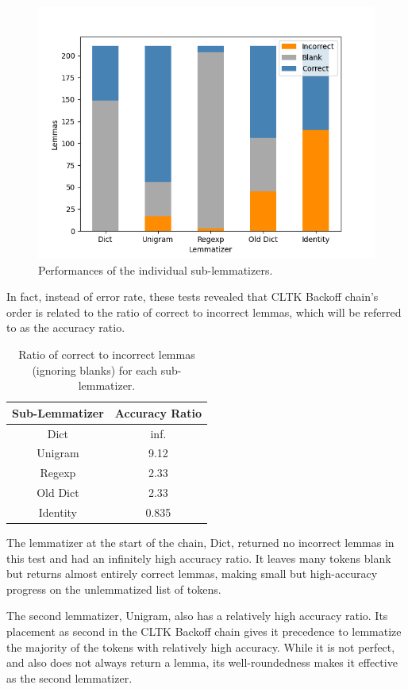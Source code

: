 \documentclass[11pt]{article}
\begin{document}
\begin{figure}
    \centering
    \includegraphics[width=0.5\linewidth]{sub_lemmatizer_performance.png}
    \caption{Performances of the individual sub-lemmatizers.}
    \label{fig:enter-label}
\end{figure}

In fact, instead of error rate, these tests revealed that CLTK Backoff chain’s order is related to the ratio of correct to incorrect lemmas, which will be referred to as the accuracy ratio.


    \begin{table}[]
        \centering
        \begin{tabular}{| c | c |}
             \hline
             Sub-Lemmatizer & Accuracy Ratio \\
             \hline
             Dict & inf. \\
             Unigram & 9.12 \\
             Regexp & 2.33 \\
             Old Dict & 2.33 \\
             Identity & 0.835 \\
             \hline
        \end{tabular}
        \caption{Ratio of correct to incorrect lemmas (ignoring blanks) for each sub-lemmatizer.}
        \label{tab:my_label}
    \end{table}

The lemmatizer at the start of the chain, Dict, returned no incorrect lemmas in this test and had an infinitely high accuracy ratio. It leaves many tokens blank but returns almost entirely correct lemmas, making small but high-accuracy progress on the unlemmatized list of tokens.

The second lemmatizer, Unigram, also has a relatively high accuracy ratio. Its placement as second in the CLTK Backoff chain gives it precedence to lemmatize the majority of the tokens with relatively high accuracy. While it is not perfect, and also does not always return a lemma, its well-roundedness makes it effective as the second lemmatizer.
\end{document}
